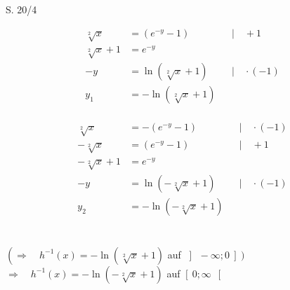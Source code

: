 \begin{Exercise}{S. 20/4}{}
\begin{enumerate}[leftmargin=*]
{\begin{enumerate}[label=\alph*), leftmargin=*]
{\begin{itemize}[leftmargin=*]
{\begin{minipage}[t]{0.45\linewidth}
\begin{align*}
                                \sqrt[2]{x} &= \left(e^{-y} - 1\right) &&| \quad + 1\\[1.5ex]
                                \sqrt[2]{x} + 1 &= e^{-y}&&\\[1.5ex]
                                -y &= \ln(\sqrt[2]{x} + 1) &&| \quad \cdot (-1)\\[1.5ex]
                                y_{1} &= - \ln(\sqrt[2]{x} + 1) &&\\[1.5ex]
                            \end{align*}
                        \end{minipage}
                        \hfill
                        \begin{minipage}[t]{0.45\linewidth}
                            \begin{align*}
                                \sqrt[2]{x} &= -\left(e^{-y} - 1\right) &&| \quad \cdot (-1)\\[1.5ex]
                                -\sqrt[2]{x} &= \left(e^{-y} - 1\right) &&| \quad + 1\\[1.5ex]
                                -\sqrt[2]{x} + 1 &= e^{-y}&&\\[1.5ex]
                                -y &= \ln(-\sqrt[2]{x} + 1) &&| \quad \cdot (-1)\\[1.5ex]
                                y_{2} &= - \ln(-\sqrt[2]{x} + 1) &&\\[1.5ex]
                            \end{align*}
                        \end{minipage}\\[-2.0ex]
                        $\left(\right.\Rightarrow \quad h^{-1}(x) = -\ln(\sqrt[2]{x} + 1)$ \quad auf \quad $\left] \ -\infty; 0 \ \right]\left.\right)$\\[1.0ex]
                        $\Rightarrow \quad h^{-1}(x) = -\ln(-\sqrt[2]{x} + 1)$ \quad auf \quad $\left[ \ 0; \infty \ \right[$\\[1.0ex]
                        }
                \end{itemize}
                }
        \end{enumerate}
        }
    \end{enumerate}
\end{Exercise}

